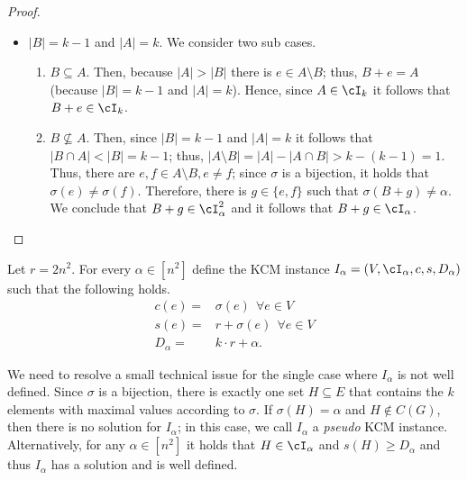 {\begin{proof}
\begin{itemize}
		\item $|B| = k-1$ and $|A| = k$. We consider two sub cases.  \begin{enumerate}
			\item $B \subseteq A$. Then, because $|A| > |B|$ there is $e \in A \setminus B$; thus, $B+e = A$ (because $|B| = k-1$ and $|A| = k$). Hence, since $A \in \cI_k$ it follows that $B+e \in \cI_k$.
			
			\item $B \not\subseteq A$.  Then, since $|B| = k-1$ and $|A| = k$ it follows that $|B \cap A| < |B| = k-1$; thus, $|A \setminus B| = |A|-|A \cap B| > k - (k-1) = 1$. Thus, there are $e,f \in A \setminus B, e\neq f$; since $\sigma$ is a bijection, it holds that $\sigma(e) \neq \sigma(f)$. Therefore, there is $g \in \{e,f\}$ such that $\sigma(B+g) \neq \alpha$. We conclude that $B+g \in \cI^2_{\alpha}$ and it follows that $B+g \in \cI_{\alpha}$. 
		\end{enumerate}
	\end{itemize}
\end{proof}

Let $r = 2n^2$. For every ${\alpha} \in  [n^2]$ define the KCM instance $I_{\alpha} = (V,\cI_{\alpha},c,s,D_{\alpha})$ such that the following holds. \begin{equation}
	\label{eq:def}
	\begin{aligned}
		c(e) ={} &  \sigma(e)  ~~\forall e \in V \\
		s(e) ={} & r+\sigma(e)~~\forall e \in V \\
		D_{\alpha} ={} &  k \cdot r+\alpha. %
	\end{aligned}
\end{equation}

We need to resolve a small technical issue for the single case where $I_{\alpha}$ is not well defined. Since $\sigma$ is a bijection, there is exactly one set $H \subseteq E$ that contains the $k$ elements with maximal values according to $\sigma$. If $\sigma(H) = \alpha$ and $H \notin C(G)$, then there is no solution for $I_{\alpha}$; in this case, we call $I_{\alpha}$ a {\em pseudo} KCM instance. Alternatively, for any $\alpha \in [n^2]$ it holds that $H \in \cI_{\alpha}$ and $s(H) \geq D_{\alpha}$ and thus $I_{\alpha}$ has a solution and is well defined. %

}

